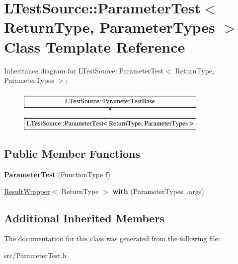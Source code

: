 \hypertarget{class_l_test_source_1_1_parameter_test}{\section{L\-Test\-Source\-:\-:Parameter\-Test$<$ Return\-Type, Parameter\-Types $>$ Class Template Reference}
\label{class_l_test_source_1_1_parameter_test}
}
Inheritance diagram for L\-Test\-Source\-:\-:Parameter\-Test$<$ Return\-Type, Parameter\-Types $>$\-:\begin{figure}[H]
\begin{center}
\leavevmode
\includegraphics[height=2.000000cm]{class_l_test_source_1_1_parameter_test}
\end{center}
\end{figure}
\subsection*{Public Member Functions}
\begin{DoxyCompactItemize}
\item 
\hypertarget{class_l_test_source_1_1_parameter_test_a55b811d4db14be96541b34c61459c696}{{\bfseries Parameter\-Test} (Function\-Type f)}\label{class_l_test_source_1_1_parameter_test_a55b811d4db14be96541b34c61459c696}

\item 
\hypertarget{class_l_test_source_1_1_parameter_test_a09401cf1e1f25dfa349780872eeedc48}{\hyperlink{class_l_test_source_1_1_result_wrapper}{Result\-Wrapper}$<$ Return\-Type $>$ {\bfseries with} (Parameter\-Types...\-args)}\label{class_l_test_source_1_1_parameter_test_a09401cf1e1f25dfa349780872eeedc48}

\end{DoxyCompactItemize}
\subsection*{Additional Inherited Members}


The documentation for this class was generated from the following file\-:\begin{DoxyCompactItemize}
\item 
src/Parameter\-Test.\-h\end{DoxyCompactItemize}
